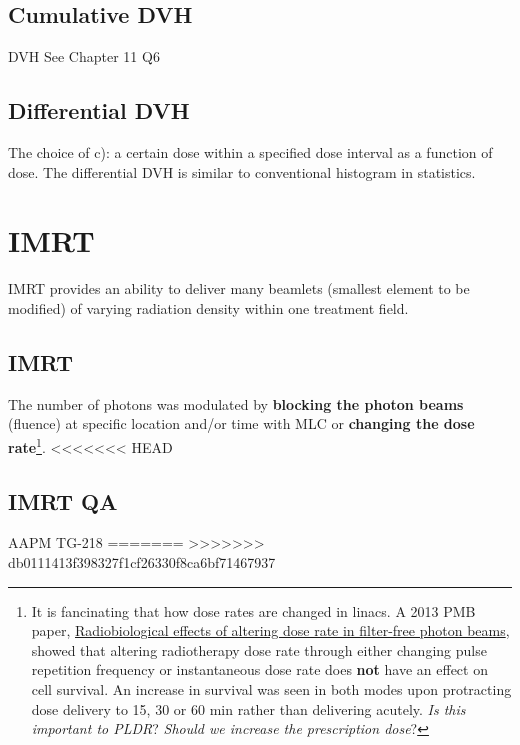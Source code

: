\documentclass[]{book}
\let\rmarkdownfootnote\footnote%
\def\footnote{\protect\rmarkdownfootnote}
\theoremstyle{definition}
\theoremstyle{definition}
\theoremstyle{definition}
\theoremstyle{remark}
\begin{document}
\section{Cumulative DVH}\label{cumulative-dvh}

DVH See Chapter 11 Q6

\section{Differential DVH}\label{differential-dvh}

The choice of c): a certain dose within a specified dose interval as a
function of dose. The differential DVH is similar to conventional
histogram in statistics.

\chapter{IMRT}\label{imrt}

IMRT provides an ability to deliver many beamlets (smallest element to
be modified) of varying radiation density within one treatment field.

\section{IMRT}\label{imrt}

The number of photons was modulated by \textbf{blocking the photon
beams} (fluence) at specific location and/or time with MLC or
\textbf{changing the dose rate}\footnote{It is fancinating that how dose
  rates are changed in linacs. A 2013 PMB paper,
  \href{http://iopscience.iop.org/article/10.1088/0031-9155/58/4/1075/meta}{Radiobiological
  effects of altering dose rate in filter-free photon beams}, showed
  that altering radiotherapy dose rate through either changing pulse
  repetition frequency or instantaneous dose rate does \textbf{not} have
  an effect on cell survival. An increase in survival was seen in both
  modes upon protracting dose delivery to 15, 30 or 60 min rather than
  delivering acutely. \emph{Is this important to PLDR}? \emph{Should we
  increase the prescription dose}?}.
<<<<<<< HEAD

\section{IMRT QA}\label{psqa}

AAPM TG-218
=======
>>>>>>> db0111413f398327f1cf26330f8ca6bf71467937
\end{document}
